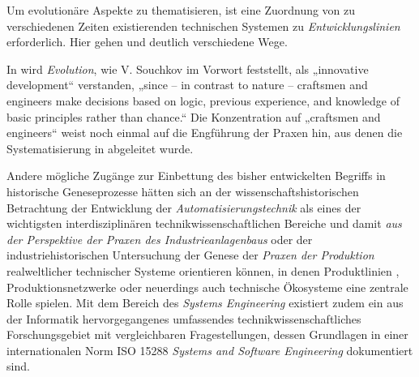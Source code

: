 \documentclass[11pt,a4paper]{article}
\begin{document}
Um evolutionäre Aspekte zu thematisieren, ist eine Zuordnung von zu
verschiedenen Zeiten existierenden technischen Systemen zu
\emph{Entwicklungslinien} erforderlich. Hier gehen \cite{Shpakovsky2010} und
\cite{TESE2018} deutlich verschiedene Wege.

In \cite{TESE2018} wird \emph{Evolution}, wie V. Souchkov im Vorwort
\cite[S. IX]{TESE2018} feststellt, als „innovative development“ verstanden,
„since -- in contrast to nature -- craftsmen and engineers make decisions
based on logic, previous experience, and knowledge of basic principles rather
than chance.“ Die Konzentration auf „craftsmen and engineers“ weist noch
einmal auf die Engführung der Praxen hin, aus denen die Systematisierung in
\cite{TESE2018} abgeleitet wurde.

Andere mögliche Zugänge zur Einbettung des bisher entwickelten Begriffs in
historische Geneseprozesse hätten sich an der wissenschaftshistorischen
Betrachtung \cite{Weller2008} der Entwicklung der
\emph{Automatisierungstechnik} als eines der wichtigsten interdisziplinären
technikwissenschaftlichen Bereiche und damit \emph{aus der Perspektive der
  Praxen des Industrieanlagenbaus} oder der industriehistorischen Untersuchung
der Genese der \emph{Praxen der Produktion} realweltlicher technischer Systeme
orientieren können, in denen Produktlinien \cite{Pohl2005},
Produktionsnetzwerke \cite{Friedli2013} oder neuerdings auch technische
Ökosysteme \cite{Graebe2018} eine zentrale Rolle spielen. Mit dem Bereich des
\emph{Systems Engineering} existiert zudem ein aus der Informatik
hervorgegangenes umfassendes technikwissenschaftliches Forschungsgebiet mit
vergleichbaren Fragestellungen, dessen Grundlagen in einer internationalen
Norm ISO 15288 \emph{Systems and Software Engineering} dokumentiert sind.
\end{document}
